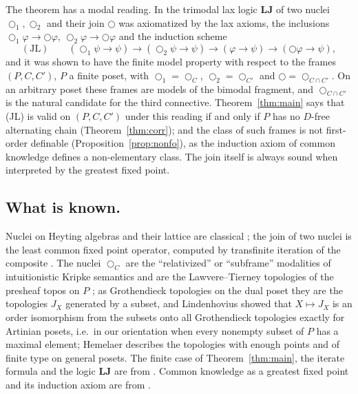 \documentclass[11pt]{amsart}
\theoremstyle{definition}
\newcommand{\LLJ}{\mathbf{LJ}}
\newcommand{\lax}{\bigcirc}
\newcommand{\laxa}{\bigcirc_1}
\newcommand{\laxb}{\bigcirc_2}
\begin{document}
The theorem has a modal reading. In \cite{Laxjoin} the trimodal lax logic
$\LLJ$ of two nuclei $\laxa,\laxb$ and their join $\lax$ was axiomatized by
the lax axioms, the inclusions $\laxa\varphi\to\lax\varphi$,
$\laxb\varphi\to\lax\varphi$ and the induction scheme
\[
\mathrm{(JL)}\qquad(\laxa\psi\to\psi)\to(\laxb\psi\to\psi)\to(\varphi\to\psi)\to(\lax\varphi\to\psi),
\]
and it was shown to have the finite model property with respect to the frames
$(P,C,C')$, $P$ a finite poset, with $\laxa=\lax_C$, $\laxb=\lax_{C'}$ and
$\lax=\lax_{C\cap C'}$. On an arbitrary poset these frames are models of the
bimodal fragment, and $\lax_{C\cap C'}$ is the natural candidate for the
third connective. Theorem~\ref{thm:main} says that (JL) is valid on
$(P,C,C')$ under this reading if and only if $P$ has no $D$-free alternating
chain (Theorem~\ref{thm:corr}); and the class of such frames is not
first-order definable (Proposition~\ref{prop:nonfo}), as the induction axiom
of common knowledge defines a non-elementary class. The join itself is always
sound when interpreted by the greatest fixed point.

\subsection*{What is known.}
Nuclei on Heyting algebras and their lattice are classical
\cite{Macnab,Johnstone}; the join of two nuclei is the least common fixed
point operator, computed by transfinite iteration of the composite
\cite{Macnab,Escardo}. The nuclei $\lax_C$ are the ``relativized'' or
``subframe'' modalities of intuitionistic Kripke semantics and are the
Lawvere--Tierney topologies of the presheaf topos on $P$
\cite{Goldblatt,Laxjoin}; as Grothendieck topologies on the dual poset they
are the topologies $J_X$ generated by a subset, and Lindenhovius
\cite[Prop.~2.11, Thm.~2.12]{Lindenhovius} showed that $X\mapsto J_X$ is an
order isomorphism from the subsets onto all Grothendieck topologies exactly
for Artinian posets, i.e.\ in our orientation when every nonempty subset of
$P$ has a maximal element; Hemelaer \cite{Hemelaer} describes the
topologies with enough points and of finite type on general posets. The
finite case of Theorem~\ref{thm:main}, the iterate formula and the logic
$\LLJ$ are from \cite{Laxjoin}. Common
knowledge as a greatest fixed point and its induction axiom are from
\cite{HM}.
\end{document}
